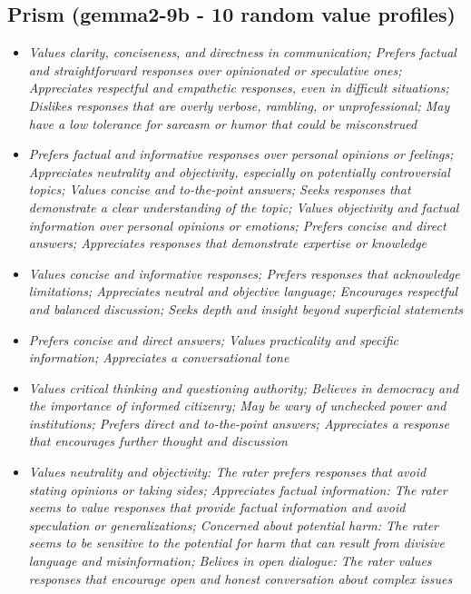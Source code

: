 \documentclass[11pt]{article}
\newcommand{\profiletext}[1]{\textit{#1}}
\begin{document}
\subsection{Prism (gemma2-9b - 10 random value profiles)}
\begin{itemize}
\item \profiletext{Values clarity, conciseness, and directness in communication; Prefers factual and straightforward responses over opinionated or speculative ones; Appreciates respectful and empathetic responses, even in difficult situations; Dislikes responses that are overly verbose, rambling, or unprofessional; May have a low tolerance for sarcasm or humor that could be misconstrued}
\item \profiletext{Prefers factual and informative responses over personal opinions or feelings; Appreciates neutrality and objectivity, especially on potentially controversial topics; Values concise and to-the-point answers; Seeks responses that demonstrate a clear understanding of the topic; Values objectivity and factual information over personal opinions or emotions; Prefers concise and direct answers; Appreciates responses that demonstrate expertise or knowledge}
\item \profiletext{Values concise and informative responses; Prefers responses that acknowledge limitations; Appreciates neutral and objective language; Encourages respectful and balanced discussion; Seeks depth and insight beyond superficial statements}
\item \profiletext{Prefers concise and direct answers; Values practicality and specific information; Appreciates a conversational tone}
\item \profiletext{Values critical thinking and questioning authority; Believes in democracy and the importance of informed citizenry; May be wary of unchecked power and institutions; Prefers direct and to-the-point answers; Appreciates a response that encourages further thought and discussion}
\item \profiletext{Values neutrality and objectivity: The rater prefers responses that avoid stating opinions or taking sides; Appreciates factual information: The rater seems to value responses that provide factual information and avoid speculation or generalizations; Concerned about potential harm: The rater seems to be sensitive to the potential for harm that can result from divisive language and misinformation; Belives in open dialogue: The rater values responses that encourage open and honest conversation about complex issues}

\end{itemize}
\end{document}
